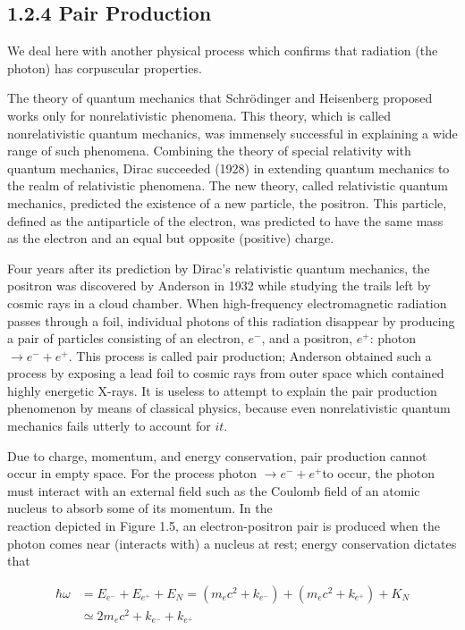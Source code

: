\documentclass[10pt]{article}
\begin{document}
\subsection*{1.2.4 Pair Production}
We deal here with another physical process which confirms that radiation (the photon) has corpuscular properties.

The theory of quantum mechanics that Schrödinger and Heisenberg proposed works only for nonrelativistic phenomena. This theory, which is called nonrelativistic quantum mechanics, was immensely successful in explaining a wide range of such phenomena. Combining the theory of special relativity with quantum mechanics, Dirac succeeded (1928) in extending quantum mechanics to the realm of relativistic phenomena. The new theory, called relativistic quantum mechanics, predicted the existence of a new particle, the positron. This particle, defined as the antiparticle of the electron, was predicted to have the same mass as the electron and an equal but opposite (positive) charge.

Four years after its prediction by Dirac's relativistic quantum mechanics, the positron was discovered by Anderson in 1932 while studying the trails left by cosmic rays in a cloud chamber. When high-frequency electromagnetic radiation passes through a foil, individual photons of this radiation disappear by producing a pair of particles consisting of an electron, $e^{-}$, and a positron, $e^{+}$: photon $\rightarrow e^{-}+e^{+}$. This process is called pair production; Anderson obtained such a process by exposing a lead foil to cosmic rays from outer space which contained highly energetic X-rays. It is useless to attempt to explain the pair production phenomenon by means of classical physics, because even nonrelativistic quantum mechanics fails utterly to account for $i t$.

Due to charge, momentum, and energy conservation, pair production cannot occur in empty space. For the process photon $\rightarrow e^{-}+e^{+}$to occur, the photon must interact with an external field such as the Coulomb field of an atomic nucleus to absorb some of its momentum. In the\\
reaction depicted in Figure 1.5, an electron-positron pair is produced when the photon comes near (interacts with) a nucleus at rest; energy conservation dictates that


\begin{align*}
\hbar \omega & =E_{e^{-}}+E_{e^{+}}+E_{N}=\left(m_{e} c^{2}+k_{e^{-}}\right)+\left(m_{e} c^{2}+k_{e^{+}}\right)+K_{N} \\
& \simeq 2 m_{e} c^{2}+k_{e^{-}}+k_{e^{+}} \tag{1.41}
\end{align*}
\end{document}
